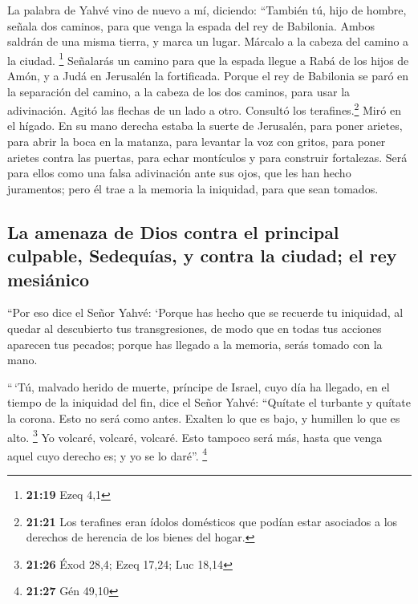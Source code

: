 \begin{paracol}{2}
 La palabra de Yahvé vino de nuevo a mí, diciendo:
 ``También tú, hijo de hombre, señala dos caminos, para
que venga la espada del rey de Babilonia. Ambos saldrán de una misma
tierra, y marca un lugar. Márcalo a la cabeza del camino a la ciudad.
\footnote{\textbf{21:19} Ezeq 4,1}  Señalarás un camino
para que la espada llegue a Rabá de los hijos de Amón, y a Judá en
Jerusalén la fortificada.  Porque el rey de Babilonia se
paró en la separación del camino, a la cabeza de los dos caminos, para
usar la adivinación. Agitó las flechas de un lado a otro. Consultó los
terafines.\footnote{\textbf{21:21} Los terafines eran ídolos domésticos
  que podían estar asociados a los derechos de herencia de los bienes
  del hogar.} Miró en el hígado.  En su mano derecha
estaba la suerte de Jerusalén, para poner arietes, para abrir la boca en
la matanza, para levantar la voz con gritos, para poner arietes contra
las puertas, para echar montículos y para construir fortalezas.
 Será para ellos como una falsa adivinación ante sus
ojos, que les han hecho juramentos; pero él trae a la memoria la
iniquidad, para que sean tomados.

\hypertarget{la-amenaza-de-dios-contra-el-principal-culpable-sedequuxedas-y-contra-la-ciudad-el-rey-mesiuxe1nico}{%
\subsection{La amenaza de Dios contra el principal culpable, Sedequías,
y contra la ciudad; el rey
mesiánico}\label{la-amenaza-de-dios-contra-el-principal-culpable-sedequuxedas-y-contra-la-ciudad-el-rey-mesiuxe1nico}}

 ``Por eso dice el Señor Yahvé: `Porque has hecho que se
recuerde tu iniquidad, al quedar al descubierto tus transgresiones, de
modo que en todas tus acciones aparecen tus pecados; porque has llegado
a la memoria, serás tomado con la mano.

 ``\,`Tú, malvado herido de muerte, príncipe de Israel,
cuyo día ha llegado, en el tiempo de la iniquidad del fin,
 dice el Señor Yahvé: ``Quítate el turbante y quítate la
corona. Esto no será como antes. Exalten lo que es bajo, y humillen lo
que es alto. \footnote{\textbf{21:26} Éxod 28,4; Ezeq 17,24; Luc 18,14}
 Yo volcaré, volcaré, volcaré. Esto tampoco será más,
hasta que venga aquel cuyo derecho es; y yo se lo daré''. \footnote{\textbf{21:27}
  Gén 49,10}


\end{paracol}
